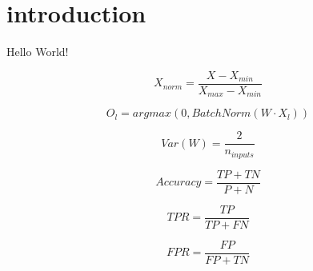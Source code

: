 \documentclass{article}
\begin{document}
\section{introduction}

Hello World!

$$ X_{norm}=\frac{X-X_{min}}{X_{max}-X_{min}} $$

$$ O_{l}=argmax(0, BatchNorm(W \cdot X_{l})) $$

$$ Var(W)=\frac{2}{n_{inputs}} $$

$$ Accuracy = \frac{TP+TN}{P+N} $$

$$ TPR = \frac{TP}{TP+FN} $$

$$ FPR = \frac{FP}{FP+TN} $$
\end{document}
